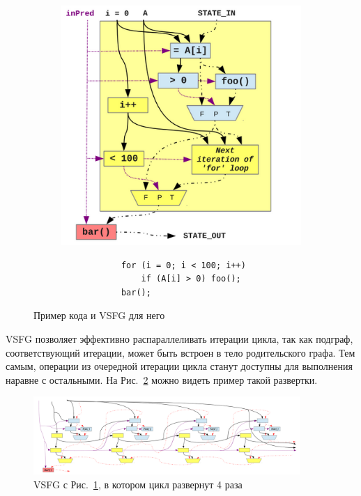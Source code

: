\documentclass{matmex-diploma-custom}
\begin{document}
\begin{figure}[h]
    \centering
    \begin{subfigure}[h]{0.4\textwidth}
        \includegraphics[width=\textwidth]{vsfg.png}
    \end{subfigure}
    \begin{subfigure}[h]{0.5\textwidth}
        \begin{verbatim}
            for (i = 0; i < 100; i++)
                if (A[i] > 0) foo();
            bar();
        \end{verbatim}
    \end{subfigure}
    \caption{Пример кода и VSFG для него \cite{vsfg}}
    \label{vsfg}
\end{figure}
    
VSFG позволяет эффективно распараллеливать итерации цикла, так как подграф, соответствующий итерации, может быть встроен в тело родительского графа. Тем самым, операции из очередной итерации цикла станут доступны для выполнения наравне с остальными. На Рис.~\ref{unrolling} можно видеть пример такой развертки.

\begin{figure}[h]
    \centering
    \includegraphics[width=0.9\textwidth]{unrolling.png}
    \caption{VSFG с Рис.~\ref{vsfg}, в котором цикл развернут 4 раза \cite{vsfg}}
    \label{unrolling}
\end{figure}
\end{document}
